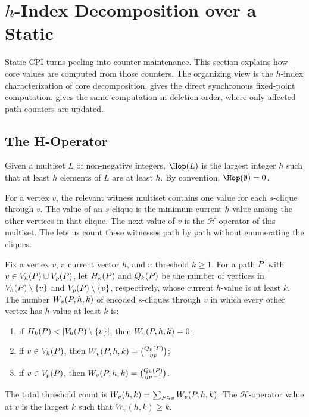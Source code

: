 \section{\texorpdfstring{\(h\)-Index Decomposition over a Static \cpi}{h-Index Decomposition over a Static CPI}}\label{sec:hindex}

Static CPI turns peeling into counter maintenance.
%
This section explains how core values are computed from those counters.
%
The organizing view is the \(h\)-index characterization of core decomposition.
%
\localH{} gives the direct synchronous fixed-point computation.
%
\peelH{} gives the same computation in deletion order, where only affected path counters are updated.

\subsection{The H-Operator}\label{sec:hop}

\begin{definition}[H-Operator]\label{def:hop}
Given a multiset \(L\) of non-negative integers, \(\Hop(L)\) is the largest integer \(h\) such that at least \(h\) elements of \(L\) are at least \(h\).
%
By convention, \(\Hop(\emptyset)=0\).
\end{definition}

For a vertex \(v\), the relevant witness multiset contains one value for each \(s\)-clique through \(v\).
%
The value of an \(s\)-clique is the minimum current \(h\)-value among the other vertices in that clique.
%
The next value of \(v\) is the \(\mathcal{H}\)-operator of this multiset.
%
The \cpi{} lets us count these witnesses path by path without enumerating the cliques.

\begin{lemma}\label{lem:per-path-witness}
Fix a vertex \(v\), a current vector \(h\), and a threshold \(k\ge1\).
%
For a path \(\TPath\) with \(v\in\Vh(\TPath)\cup\Vp(\TPath)\), let \(H_k(\TPath)\) and \(Q_k(\TPath)\) be the number of vertices in \(\Vh(\TPath)\setminus\{v\}\) and \(\Vp(\TPath)\setminus\{v\}\), respectively, whose current \(h\)-value is at least \(k\).
%
The number \(W_v(\TPath,h,k)\) of encoded \(s\)-cliques through \(v\) in which every other vertex has \(h\)-value at least \(k\) is:
\begin{enumerate}[leftmargin=1.3em,itemsep=1pt,topsep=1pt]
  \item if \(H_k(\TPath)<|\Vh(\TPath)\setminus\{v\}|\), then \(W_v(\TPath,h,k)=0\);
  \item if \(v\in\Vh(\TPath)\), then \(W_v(\TPath,h,k)=\binom{Q_k(\TPath)}{\eta_{\TPath}}\);
  \item if \(v\in\Vp(\TPath)\), then \(W_v(\TPath,h,k)=\binom{Q_k(\TPath)}{\eta_{\TPath}-1}\).
\end{enumerate}
The total threshold count is \(W_v(h,k)=\sum_{\TPath\ni v}W_v(\TPath,h,k)\).
%
The \(\mathcal{H}\)-operator value at \(v\) is the largest \(k\) such that \(W_v(h,k)\ge k\).
\end{lemma}

